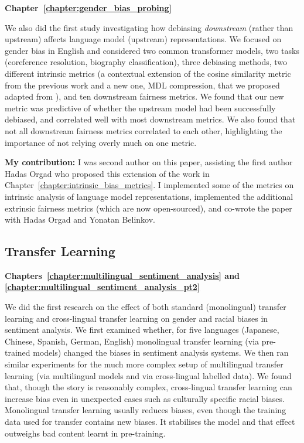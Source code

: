 \textbf{Chapter~\ref{chapter:gender_bias_probing}}

We also did the first study investigating how debiasing \textit{downstream} (rather than upstream) affects language model (upstream) representations. We focused on gender bias in English and considered two common transformer models, two tasks (coreference resolution, biography classification), three debiasing methods, two different intrinsic metrics (a contextual extension of the cosine similarity metric from the previous work and a new one, MDL compression, that we proposed adapted from \citet{voita-titov-2020-information}), and ten downstream fairness metrics. We found that our new metric was predictive of whether the upstream model had been successfully debiased, and correlated well with most downstream metrics. We also found that not all downstream fairness metrics correlated to each other, highlighting the importance of not relying overly much on one metric. 

\textbf{My contribution:} I was second author on this paper, assisting the first author Hadas Orgad who proposed this extension of the work in Chapter~\ref{chapter:intrinsic_bias_metrics}. I implemented some of the metrics on intrinsic analysis of language model representations, implemented the additional extrinsic fairness metrics (which are now open-sourced), and co-wrote the paper with Hadas Orgad and Yonatan Belinkov.

\subsection{Transfer Learning}
\textbf{Chapters~\ref{chapter:multilingual_sentiment_analysis} and \ref{chapter:multilingual_sentiment_analysis_pt2}}

We did the first research on the effect of both standard (monolingual) transfer learning and cross-lingual transfer learning on gender and racial biases in sentiment analysis. We first examined whether, for five languages (Japanese, Chinese, Spanish, German, English) monolingual transfer learning (via pre-trained models) changed the biases in sentiment analysis systems. We then ran similar experiments for the much more complex setup of multilingual transfer learning (via multilingual models and via cross-lingual labelled data). We found that, though the story is reasonably complex, cross-lingual transfer learning can increase bias even in unexpected cases such as culturally specific racial biases. Monolingual transfer learning usually reduces biases, even though the training data used for transfer contains new biases. It stabilises the model and that effect outweighs bad content learnt in pre-training. 

